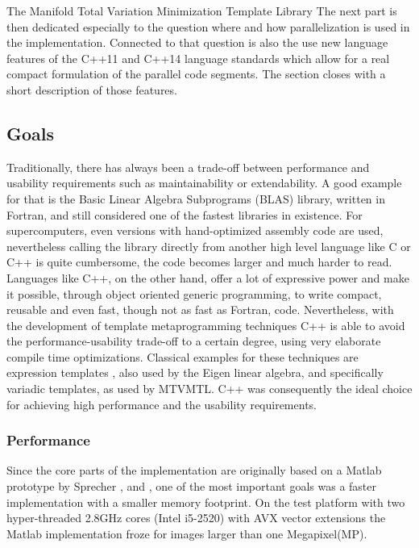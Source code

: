 \begin{chapter}{The Manifold Total Variation Minimization Template Library}
The next part is then dedicated especially to the question where and how parallelization is used in the implementation.
Connected to that question is also the use new language features of the C++11 and C++14 language standards 
which allow for a real compact formulation of the parallel code segments. 
The section closes with a short description of those features.

\subsection{Goals} %
\label{sub:Goals}
Traditionally, there has always been a trade-off between performance and usability requirements such as
maintainability or extendability. A good example for that is the Basic Linear Algebra Subprograms 
(BLAS) library, written in Fortran, and still considered one of the fastest libraries in existence. 
For supercomputers, even versions with hand-optimized assembly code are used, nevertheless calling
the library directly from another high level language like C or C++ is quite cumbersome, the code becomes
larger and much harder to read. \\

Languages like C++, on the other hand, offer a lot of expressive power and make it possible, through object oriented
generic programming, to write compact, reusable and even fast, though not as fast as Fortran, code. Nevertheless,
with the development of template metaprogramming techniques C++ is able to avoid the performance-usability
trade-off to a certain degree, using very elaborate compile time optimizations. Classical examples for these techniques are expression templates \cite{blitz}, also used by the Eigen linear algebra, and specifically variadic templates, as used by MTVMTL.
C++ was consequently the ideal choice for achieving high performance and the usability requirements.

\subsubsection{Performance} %
\label{ssub:Performance}
Since the core parts of the implementation are originally based on a Matlab prototype by Sprecher \cite{SprecherIRLS}, \cite{manuel} and \cite{mara}, one of the most important
goals was a faster implementation with a smaller memory footprint. On the test platform with two hyper-threaded 2.8GHz cores (Intel i5-2520) with AVX vector extensions
the Matlab implementation froze for images larger than one Megapixel(MP).\\


\end{chapter}
